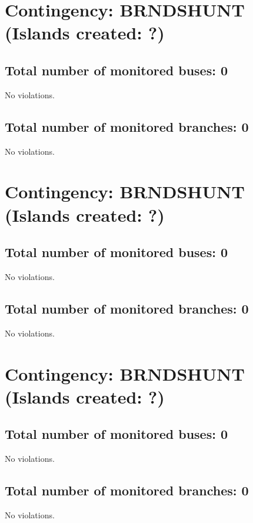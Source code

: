 \documentclass{article}%
\begin{document}
\section*{Contingency: BRNDSHUNT (Islands created: ?)}%
\label{sec:ContingencyBRNDSHUNT(Islandscreated?)}%
\subsection*{Total number of monitored buses: 0}%
\label{subsec:Totalnumberofmonitoredbuses0}%
No violations.

%
\subsection*{Total number of monitored branches: 0}%
\label{subsec:Totalnumberofmonitoredbranches0}%
No violations.

%
\maketitle%
\section*{Contingency: BRNDSHUNT (Islands created: ?)}%
\label{sec:ContingencyBRNDSHUNT(Islandscreated?)}%
\subsection*{Total number of monitored buses: 0}%
\label{subsec:Totalnumberofmonitoredbuses0}%
No violations.

%
\subsection*{Total number of monitored branches: 0}%
\label{subsec:Totalnumberofmonitoredbranches0}%
No violations.

%
\maketitle%
\section*{Contingency: BRNDSHUNT (Islands created: ?)}%
\label{sec:ContingencyBRNDSHUNT(Islandscreated?)}%
\subsection*{Total number of monitored buses: 0}%
\label{subsec:Totalnumberofmonitoredbuses0}%
No violations.

%
\subsection*{Total number of monitored branches: 0}%
\label{subsec:Totalnumberofmonitoredbranches0}%
No violations.

%
\end{document}
